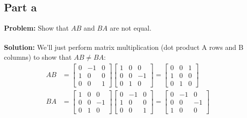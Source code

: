 \documentclass{article}
\begin{document}
\subsection*{Part a}
\textbf{Problem:} Show that $AB$ and $BA$ are not equal.
\\\\
\textbf{Solution:} We'll just perform matrix multiplication (dot product A rows and B columns) to show that $AB\not=BA$:
\begin{align*}
AB&=\begin{bmatrix}
    0 & -1 & 0 \\
    1 & 0 & 0 \\
    0 & 0 & 1
\end{bmatrix}
\begin{bmatrix}
    1 & 0 & 0 \\
    0 & 0 & -1 \\
    0 & 1 & 0
\end{bmatrix}=
\begin{bmatrix}
    0 & 0 & 1 \\
    1 & 0 & 0 \\
    0 & 1 & 0
\end{bmatrix}\\
BA&=\begin{bmatrix}
    1 & 0 & 0 \\
    0 & 0 & -1 \\
    0 & 1 & 0
\end{bmatrix}
\begin{bmatrix}
    0 & -1 & 0 \\
    1 & 0 & 0 \\
    0 & 0 & 1
\end{bmatrix}=
\begin{bmatrix}
    0 & -1 & 0 \\
    0 & 0 & -1 \\
    1 & 0 & 0
\end{bmatrix}
\end{align*}
\end{document}
